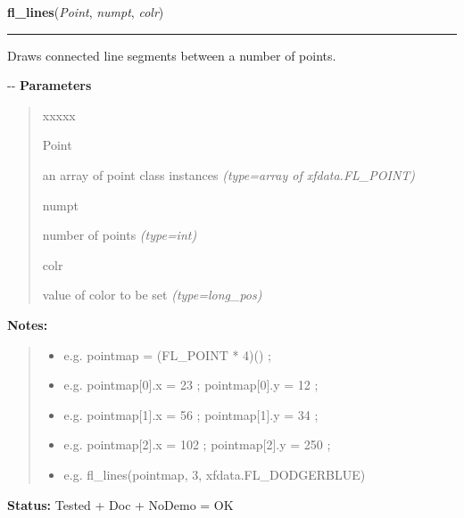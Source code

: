 \hspace{.8\funcindent}\begin{boxedminipage}{\funcwidth}

    \raggedright \textbf{fl\_lines}(\textit{Point}, \textit{numpt}, \textit{colr})

    \vspace{-1.5ex}

    \rule{\textwidth}{0.5\fboxrule}
\setlength{\parskip}{2ex}

Draws connected line segments between a number of points.

-{}-
\setlength{\parskip}{1ex}
      \textbf{Parameters}
      \vspace{-1ex}

      \begin{quote}
        \begin{Ventry}{xxxxx}

          \item[Point]


an array of point class instances
            {\it (type=array of xfdata.FL\_POINT)}

          \item[numpt]


number of points
            {\it (type=int)}

          \item[colr]


value of color to be set
            {\it (type=long\_pos)}

        \end{Ventry}

      \end{quote}

\textbf{Notes:}
\begin{quote}
  \begin{itemize}

  \item
    \setlength{\parskip}{0.6ex}

e.g. pointmap = (FL\_POINT * 4)() ;


  \item 
e.g. pointmap{[}0{]}.x = 23 ; pointmap{[}0{]}.y = 12 ;


  \item 
e.g. pointmap{[}1{]}.x = 56 ; pointmap{[}1{]}.y = 34 ;


  \item 
e.g. pointmap{[}2{]}.x = 102 ; pointmap{[}2{]}.y = 250 ;


  \item 
e.g. fl\_lines(pointmap, 3, xfdata.FL\_DODGERBLUE)


\end{itemize}

\end{quote}

\textbf{Status:} 
Tested + Doc + NoDemo = OK


    \end{boxedminipage}

